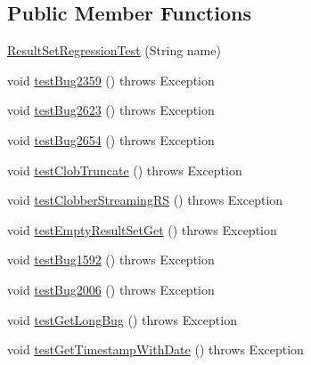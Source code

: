\subsection*{Public Member Functions}
\begin{DoxyCompactItemize}
\item 
\mbox{\hyperlink{classtestsuite_1_1regression_1_1_result_set_regression_test_a5ca33c73ced6b3a694b444d75b08413b}{Result\+Set\+Regression\+Test}} (String name)
\item 
void \mbox{\hyperlink{classtestsuite_1_1regression_1_1_result_set_regression_test_abbc0f0354f17c3a1468ce5edd59b7ed0}{test\+Bug2359}} ()  throws Exception 
\item 
void \mbox{\hyperlink{classtestsuite_1_1regression_1_1_result_set_regression_test_a5cf13074c3f54ef463c169be1423a3ba}{test\+Bug2623}} ()  throws Exception 
\item 
void \mbox{\hyperlink{classtestsuite_1_1regression_1_1_result_set_regression_test_a32ba87707ddb894483b0813570ec5571}{test\+Bug2654}} ()  throws Exception 
\item 
void \mbox{\hyperlink{classtestsuite_1_1regression_1_1_result_set_regression_test_a4a5ee07e3208b64df9f192a86b6a4993}{test\+Clob\+Truncate}} ()  throws Exception 
\item 
void \mbox{\hyperlink{classtestsuite_1_1regression_1_1_result_set_regression_test_a98618c59f0d4f7f13323676c6352cdc8}{test\+Clobber\+Streaming\+RS}} ()  throws Exception 
\item 
void \mbox{\hyperlink{classtestsuite_1_1regression_1_1_result_set_regression_test_aa66e7a3d877155bf047bd8f2dd7e42cb}{test\+Empty\+Result\+Set\+Get}} ()  throws Exception 
\item 
void \mbox{\hyperlink{classtestsuite_1_1regression_1_1_result_set_regression_test_a5f550a75e1f4f38d642553a5115f9257}{test\+Bug1592}} ()  throws Exception 
\item 
void \mbox{\hyperlink{classtestsuite_1_1regression_1_1_result_set_regression_test_a629011171ee3f908eb188d2f9ad1ea35}{test\+Bug2006}} ()  throws Exception 
\item 
void \mbox{\hyperlink{classtestsuite_1_1regression_1_1_result_set_regression_test_ad99758a5458b83ac934b1a347ae47e5a}{test\+Get\+Long\+Bug}} ()  throws Exception 
\item 
void \mbox{\hyperlink{classtestsuite_1_1regression_1_1_result_set_regression_test_a23489ba51cbd6ffe491828ee72a871f1}{test\+Get\+Timestamp\+With\+Date}} ()  throws Exception 
\item 

\end{DoxyCompactItemize}
